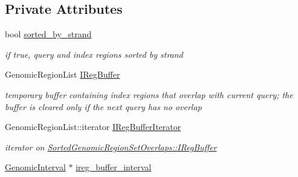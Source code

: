 \subsection*{Private Attributes}
\begin{DoxyCompactItemize}
\item 
\hypertarget{classSortedGenomicRegionSetOverlaps_af08c449faa6ba7be7c6ed9c07f4226e3}{
bool \hyperlink{classSortedGenomicRegionSetOverlaps_af08c449faa6ba7be7c6ed9c07f4226e3}{sorted\_\-by\_\-strand}}
\label{classSortedGenomicRegionSetOverlaps_af08c449faa6ba7be7c6ed9c07f4226e3}

\begin{DoxyCompactList}\small\item\em if true, query and index regions sorted by strand \end{DoxyCompactList}\item 
\hypertarget{classSortedGenomicRegionSetOverlaps_a19fa18e6abd9f045786698fff48a445f}{
GenomicRegionList \hyperlink{classSortedGenomicRegionSetOverlaps_a19fa18e6abd9f045786698fff48a445f}{IRegBuffer}}
\label{classSortedGenomicRegionSetOverlaps_a19fa18e6abd9f045786698fff48a445f}

\begin{DoxyCompactList}\small\item\em temporary buffer containing index regions that overlap with current query; the buffer is cleared only if the next query has no overlap \end{DoxyCompactList}\item 
\hypertarget{classSortedGenomicRegionSetOverlaps_a71d6eea0c4bf9f19be6cf0c0c562f297}{
GenomicRegionList::iterator \hyperlink{classSortedGenomicRegionSetOverlaps_a71d6eea0c4bf9f19be6cf0c0c562f297}{IRegBufferIterator}}
\label{classSortedGenomicRegionSetOverlaps_a71d6eea0c4bf9f19be6cf0c0c562f297}

\begin{DoxyCompactList}\small\item\em iterator on \hyperlink{classSortedGenomicRegionSetOverlaps_a19fa18e6abd9f045786698fff48a445f}{SortedGenomicRegionSetOverlaps::IRegBuffer} \end{DoxyCompactList}\item 
\hypertarget{classSortedGenomicRegionSetOverlaps_a962f8e6ce8c15703cfefa574a07ce42c}{
\hyperlink{classGenomicInterval}{GenomicInterval} $\ast$ \hyperlink{classSortedGenomicRegionSetOverlaps_a962f8e6ce8c15703cfefa574a07ce42c}{ireg\_\-buffer\_\-interval}}
\label{classSortedGenomicRegionSetOverlaps_a962f8e6ce8c15703cfefa574a07ce42c}


\end{DoxyCompactItemize}

